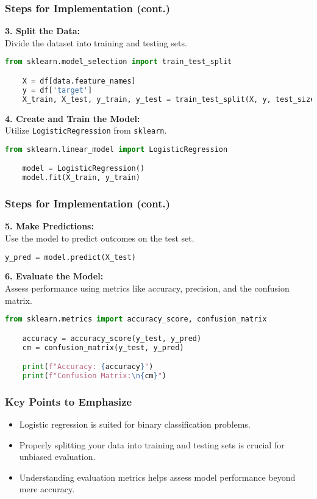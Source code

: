 \documentclass[aspectratio=169]{beamer}
\begin{document}
\begin{frame}[fragile]
    \frametitle{Steps for Implementation (cont.)}
    \textbf{3. Split the Data:} \\
    Divide the dataset into training and testing sets.
    \begin{lstlisting}[language=Python]
    from sklearn.model_selection import train_test_split

    X = df[data.feature_names]
    y = df['target']
    X_train, X_test, y_train, y_test = train_test_split(X, y, test_size=0.2, random_state=42)
    \end{lstlisting}

    \textbf{4. Create and Train the Model:} \\
    Utilize \texttt{LogisticRegression} from \texttt{sklearn}.
    \begin{lstlisting}[language=Python]
    from sklearn.linear_model import LogisticRegression

    model = LogisticRegression()
    model.fit(X_train, y_train)
    \end{lstlisting}
\end{frame}

\begin{frame}[fragile]
    \frametitle{Steps for Implementation (cont.)}
    \textbf{5. Make Predictions:} \\
    Use the model to predict outcomes on the test set.
    \begin{lstlisting}[language=Python]
    y_pred = model.predict(X_test)
    \end{lstlisting}

    \textbf{6. Evaluate the Model:} \\
    Assess performance using metrics like accuracy, precision, and the confusion matrix.
    \begin{lstlisting}[language=Python]
    from sklearn.metrics import accuracy_score, confusion_matrix

    accuracy = accuracy_score(y_test, y_pred)
    cm = confusion_matrix(y_test, y_pred)

    print(f"Accuracy: {accuracy}")
    print(f"Confusion Matrix:\n{cm}")
    \end{lstlisting}
\end{frame}

\begin{frame}
    \frametitle{Key Points to Emphasize}
    \begin{itemize}
        \item Logistic regression is suited for binary classification problems.
        \item Properly splitting your data into training and testing sets is crucial for unbiased evaluation.
        \item Understanding evaluation metrics helps assess model performance beyond mere accuracy.
    \end{itemize}
\end{frame}
\end{document}
